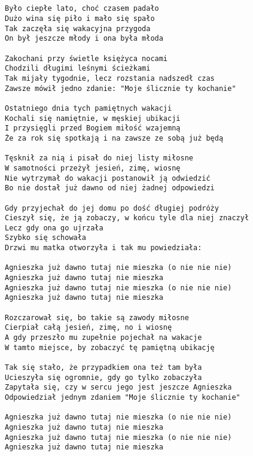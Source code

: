 \documentclass[12pt]{article}
\begin{document}
\subsection*{}
\begin{verbatim}
Było ciepłe lato, choć czasem padało
Dużo wina się piło i mało się spało
Tak zaczęła się wakacyjna przygoda
On był jeszcze młody i ona była młoda

Zakochani przy świetle księżyca nocami
Chodzili długimi leśnymi ścieżkami
Tak mijały tygodnie, lecz rozstania nadszedł czas
Zawsze mówił jedno zdanie: "Moje ślicznie ty kochanie"

Ostatniego dnia tych pamiętnych wakacji
Kochali się namiętnie, w męskiej ubikacji
I przysięgli przed Bogiem miłość wzajemną
Że za rok się spotkają i na zawsze ze sobą już będą

Tęsknił za nią i pisał do niej listy miłosne
W samotności przeżył jesień, zimę, wiosnę
Nie wytrzymał do wakacji postanowił ją odwiedzić
Bo nie dostał już dawno od niej żadnej odpowiedzi

Gdy przyjechał do jej domu po dość długiej podróży
Cieszył się, że ją zobaczy, w końcu tyle dla niej znaczył
Lecz gdy ona go ujrzała
Szybko się schowała
Drzwi mu matka otworzyła i tak mu powiedziała:

Agnieszka już dawno tutaj nie mieszka (o nie nie nie)
Agnieszka już dawno tutaj nie mieszka
Agnieszka już dawno tutaj nie mieszka (o nie nie nie)
Agnieszka już dawno tutaj nie mieszka

Rozczarował się, bo takie są zawody miłosne
Cierpiał całą jesień, zimę, no i wiosnę
A gdy przeszło mu zupełnie pojechał na wakacje
W tamto miejsce, by zobaczyć tę pamiętną ubikację

Tak się stało, że przypadkiem ona też tam była
Ucieszyła się ogromnie, gdy go tylko zobaczyła
Zapytała się, czy w sercu jego jest jeszcze Agnieszka
Odpowiedział jednym zdaniem "Moje ślicznie ty kochanie"

Agnieszka już dawno tutaj nie mieszka (o nie nie nie)
Agnieszka już dawno tutaj nie mieszka
Agnieszka już dawno tutaj nie mieszka (o nie nie nie)
Agnieszka już dawno tutaj nie mieszka
\end{verbatim}
\clearpage

\subsection*{}
\end{document}
